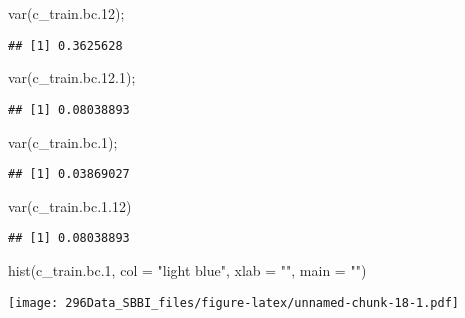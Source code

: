 \documentclass[
]{article}
\newenvironment{Shaded}{\begin{snugshade}}{\end{snugshade}}
\newcommand{\AttributeTok}[1]{\textcolor[rgb]{0.77,0.63,0.00}{#1}}
\newcommand{\FloatTok}[1]{\textcolor[rgb]{0.00,0.00,0.81}{#1}}
\newcommand{\FunctionTok}[1]{\textcolor[rgb]{0.00,0.00,0.00}{#1}}
\newcommand{\NormalTok}[1]{#1}
\newcommand{\StringTok}[1]{\textcolor[rgb]{0.31,0.60,0.02}{#1}}
\begin{document}
\begin{Shaded}
\begin{Highlighting}[]
\FunctionTok{var}\NormalTok{(c\_train.bc}\FloatTok{.12}\NormalTok{);}
\end{Highlighting}
\end{Shaded}

\begin{verbatim}
## [1] 0.3625628
\end{verbatim}

\begin{Shaded}
\begin{Highlighting}[]
\FunctionTok{var}\NormalTok{(c\_train.bc.}\FloatTok{12.1}\NormalTok{);}
\end{Highlighting}
\end{Shaded}

\begin{verbatim}
## [1] 0.08038893
\end{verbatim}

\begin{Shaded}
\begin{Highlighting}[]
\FunctionTok{var}\NormalTok{(c\_train.bc}\FloatTok{.1}\NormalTok{);}
\end{Highlighting}
\end{Shaded}

\begin{verbatim}
## [1] 0.03869027
\end{verbatim}

\begin{Shaded}
\begin{Highlighting}[]
\FunctionTok{var}\NormalTok{(c\_train.bc.}\FloatTok{1.12}\NormalTok{)}
\end{Highlighting}
\end{Shaded}

\begin{verbatim}
## [1] 0.08038893
\end{verbatim}

\begin{Shaded}
\begin{Highlighting}[]
\FunctionTok{hist}\NormalTok{(c\_train.bc}\FloatTok{.1}\NormalTok{, }\AttributeTok{col =} \StringTok{"light blue"}\NormalTok{, }\AttributeTok{xlab =} \StringTok{""}\NormalTok{, }\AttributeTok{main =} \StringTok{""}\NormalTok{) }
\end{Highlighting}
\end{Shaded}

\texttt{[image: 296Data\_SBBI\_files/figure-latex/unnamed-chunk-18-1.pdf]}
\end{document}
